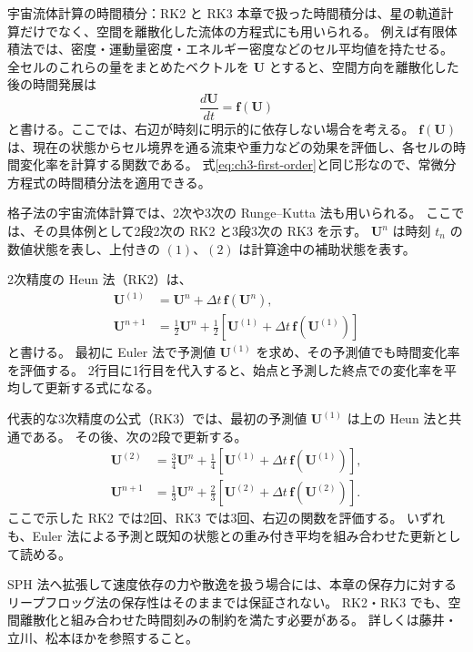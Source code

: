 \begin{topicblock}{宇宙流体計算の時間積分：RK2 と RK3}
本章で扱った時間積分は、星の軌道計算だけでなく、空間を離散化した流体の方程式にも用いられる。
例えば有限体積法では、密度・運動量密度・エネルギー密度などのセル平均値を持たせる。
全セルのこれらの量をまとめたベクトルを $\boldsymbol{U}$ とすると、空間方向を離散化した後の時間発展は
\begin{equation}
 \frac{d\boldsymbol{U}}{dt}=\boldsymbol{f}(\boldsymbol{U})
\label{eq:ch3-hydro-ode}
\end{equation}
と書ける。ここでは、右辺が時刻に明示的に依存しない場合を考える。
$\boldsymbol{f}(\boldsymbol{U})$ は、現在の状態からセル境界を通る流束や重力などの効果を評価し、各セルの時間変化率を計算する関数である。
式\eqref{eq:ch3-first-order}と同じ形なので、常微分方程式の時間積分法を適用できる。

格子法の宇宙流体計算では、2次や3次の Runge--Kutta 法も用いられる\cite{fujii2020,matsumoto}。
ここでは、その具体例として2段2次の RK2 と3段3次の RK3 を示す。
$\boldsymbol{U}^n$ は時刻 $t_n$ の数値状態を表し、上付きの $(1)$、$(2)$ は計算途中の補助状態を表す。

2次精度の Heun 法（RK2）は、
\begin{align*}
 \boldsymbol{U}^{(1)}&=\boldsymbol{U}^n+\Delta t\,\boldsymbol{f}(\boldsymbol{U}^n),\\
 \boldsymbol{U}^{n+1}&=\frac12\boldsymbol{U}^n+\frac12\left[\boldsymbol{U}^{(1)}+\Delta t\,\boldsymbol{f}(\boldsymbol{U}^{(1)})\right]
\end{align*}
と書ける。
最初に Euler 法で予測値 $\boldsymbol{U}^{(1)}$ を求め、その予測値でも時間変化率を評価する。
2行目に1行目を代入すると、始点と予測した終点での変化率を平均して更新する式になる。

代表的な3次精度の公式（RK3）では、最初の予測値 $\boldsymbol{U}^{(1)}$ は上の Heun 法と共通である。
その後、次の2段で更新する。
\begin{align*}
 \boldsymbol{U}^{(2)}&=\frac34\boldsymbol{U}^n+\frac14\left[\boldsymbol{U}^{(1)}+\Delta t\,\boldsymbol{f}(\boldsymbol{U}^{(1)})\right],\\
 \boldsymbol{U}^{n+1}&=\frac13\boldsymbol{U}^n+\frac23\left[\boldsymbol{U}^{(2)}+\Delta t\,\boldsymbol{f}(\boldsymbol{U}^{(2)})\right].
\end{align*}
ここで示した RK2 では2回、RK3 では3回、右辺の関数を評価する。
いずれも、Euler 法による予測と既知の状態との重み付き平均を組み合わせた更新として読める。

SPH 法へ拡張して速度依存の力や散逸を扱う場合には、本章の保存力に対するリープフロッグ法の保存性はそのままでは保証されない。
RK2・RK3 でも、空間離散化と組み合わせた時間刻みの制約を満たす必要がある。
詳しくは藤井・立川\cite{fujii2020}、松本ほか\cite{matsumoto}を参照すること。
\end{topicblock}

